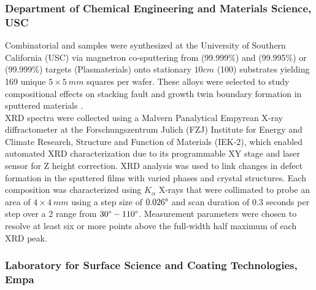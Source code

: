 \subsubsection*{Department of Chemical Engineering and Materials Science, USC}

Combinatorial  and  samples were synthesized at the University of Southern California (USC) via magnetron co-sputtering from  (99.999\%) and  (99.995\%) or  (99.999\%) targets (Plasmaterials) onto stationary $10 \si{cm}$  (100) substrates yielding 169 unique $5 \times 5 \ \si{mm}$ squares per wafer. These alloys were selected to study compositional effects on stacking fault and growth twin boundary formation in sputtered materials \cite{alwen2024_1,alwen2024_2}. \\

XRD spectra were collected using a Malvern Panalytical Empyrean X-ray diffractometer at the Forschungszentrum Julich (FZJ) Institute for Energy and Climate Research, Structure and Function of Materials (IEK-2), which enabled automated XRD characterization due to its programmable XY stage and laser sensor for Z height correction. XRD analysis was used to link changes in defect formation in the sputtered films with varied phases and crystal structures. Each composition was characterized using  $K_\alpha$ X-rays that were collimated to probe an area of $4 \times 4 \ \si{mm}$ using a step size of $0.026\degree$ and scan duration of $0.3$ seconds per step over a 2 range from $30\degree - 110\degree$. Measurement parameters were chosen to resolve at least six or more points above the full-width half maximum of each XRD peak.

\subsubsection*{Laboratory for Surface Science and Coating Technologies, Empa}

